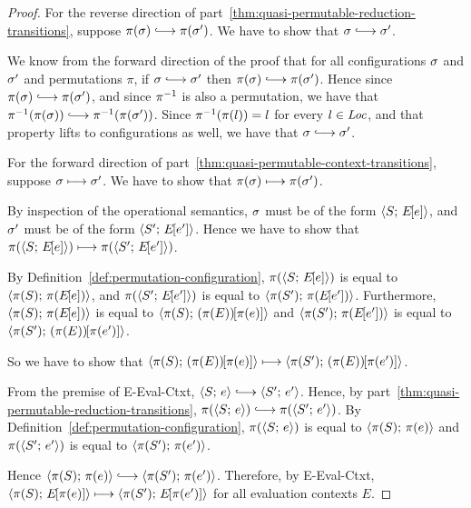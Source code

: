 \begin{proof}
  For the reverse direction of
  part~\ref{thm:quasi-permutable-reduction-transitions}, suppose
  $\pi(\conf) \parstepsto \pi(\conf')$.  We have to show that $\conf
  \parstepsto \conf'$.

  We know from the forward direction of the proof that for all
  configurations $\sigma$ and $\sigma'$ and permutations $\pi$, if
  $\conf \parstepsto \conf'$ then $\pi(\conf) \parstepsto
  \pi(\conf')$.  Hence since $\pi(\conf) \parstepsto \pi(\conf')$, and
  since $\pi^{-1}$ is also a permutation, we have that
  $\piinv(\pi(\conf)) \parstepsto \piinv(\pi(\conf'))$.  Since
  $\pi^{-1}(\pi(l)) = l$ for every $l \in \mathit{Loc}$, and that property lifts
  to configurations as well, we have that $\conf \parstepsto \conf'$.


  For the forward direction of
  part~\ref{thm:quasi-permutable-context-transitions}, suppose $\sigma
  \longmapsto \sigma'$.  We have to show that $\pi(\sigma) \longmapsto
  \pi(\sigma')$.

  By inspection of the operational semantics, $\sigma$ must be of the
  form $\langle S;\, E\hspace{-1mm}\left[e\right] \rangle$, and $\sigma'$ must be of the form
  $\langle S';\, E\hspace{-1mm}\left[e'\right] \rangle$.  Hence we have to show that
  $\pi(\langle S;\, E\hspace{-1mm}\left[e\right] \rangle) \longmapsto \pi(\langle S';\, E\hspace{-1mm}\left[e'\right] \rangle)$.

  By Definition~\ref{def:permutation-configuration},
  $\pi(\langle S;\, E\hspace{-1mm}\left[e\right] \rangle)$ is equal to $\langle \pi(S);\, \pi(E\hspace{-1mm}\left[e\right]) \rangle$,
  and $\pi(\langle S';\, E\hspace{-1mm}\left[e'\right] \rangle)$ is equal to
  $\langle \pi(S');\, \pi(E\hspace{-1mm}\left[e'\right]) \rangle$.  Furthermore,
  $\langle \pi(S);\, \pi(E\hspace{-1mm}\left[e\right]) \rangle$ is equal to
  $\langle \pi(S);\, (\pi(E))\hspace{-1mm}\left[\pi(e)\right] \rangle$ and
  $\langle \pi(S');\, \pi(E\hspace{-1mm}\left[e'\right]) \rangle$ is equal to
  $\langle \pi(S');\, (\pi(E))\hspace{-1mm}\left[\pi(e')\right] \rangle$.

  So we have to show that
  $\langle \pi(S);\, (\pi(E))\hspace{-1mm}\left[\pi(e)\right] \rangle \longmapsto
  \langle \pi(S');\, (\pi(E))\hspace{-1mm}\left[\pi(e')\right] \rangle$.

  From the premise of {\sc E-Eval-Ctxt}, $\config{S}{e} \parstepsto
  \config{S'}{e'}$.  Hence, by
  part~\ref{thm:quasi-permutable-reduction-transitions},
  $\pi(\config{S}{e}) \parstepsto \pi(\config{S'}{e'})$.  By
  Definition~\ref{def:permutation-configuration}, $\pi(\langle S;\, e \rangle)$
  is equal to $\langle \pi(S);\, \pi(e) \rangle$ and $\pi(\langle S';\, e' \rangle)$ is
  equal to $\langle \pi(S');\, \pi(e') \rangle$.

  Hence $\config{\pi(S)}{\pi(e)} \parstepsto
  \config{\pi(S')}{\pi(e')}$.  Therefore, by {\sc E-Eval-Ctxt},
  $\langle \pi(S);\, E\hspace{-1mm}\left[\pi(e)\right] \rangle \longmapsto
  \langle \pi(S');\, E\hspace{-1mm}\left[\pi(e')\right] \rangle$ for all evaluation contexts $E$.


\end{proof}
